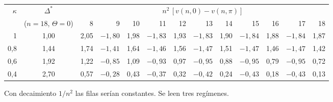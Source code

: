 \documentclass[11pt,a4paper]{article}
\theoremstyle{remark}
\begin{document}
\begin{center}\small
\begin{tabular}{rc*{11}{r}}
\toprule
$\kappa$ & $\Delta^*$ & \multicolumn{11}{c}{$n^2\,[v(n,0)-v(n,\pi)]$}\\
& ($n=18$, $\Theta=0$) & 8 & 9 & 10 & 11 & 12 & 13 & 14 & 15 & 16 & 17 & 18\\
\midrule
1   & 1,00 & 2,05 & $-1{,}80$ & 1,98 & $-1{,}83$ & 1,93 & $-1{,}83$ & 1,90 & $-1{,}84$ & 1,88 & $-1{,}84$ & 1,87\\
0,8 & 1,44 & 1,74 & $-1{,}41$ & 1,64 & $-1{,}46$ & 1,56 & $-1{,}47$ & 1,51 & $-1{,}47$ & 1,46 & $-1{,}47$ & 1,42\\
0,6 & 1,92 & 1,22 & $-0{,}85$ & 1,09 & $-0{,}93$ & 0,97 & $-0{,}95$ & 0,88 & $-0{,}95$ & 0,79 & $-0{,}95$ & 0,72\\
0,4 & 2,70 & 0,57 & $-0{,}28$ & 0,43 & $-0{,}37$ & 0,32 & $-0{,}42$ & 0,24 & $-0{,}43$ & 0,18 & $-0{,}43$ & 0,13\\
\bottomrule
\end{tabular}
\end{center}
Con decaimiento $1/n^2$ las filas serían constantes. Se leen tres regímenes.
\end{document}
